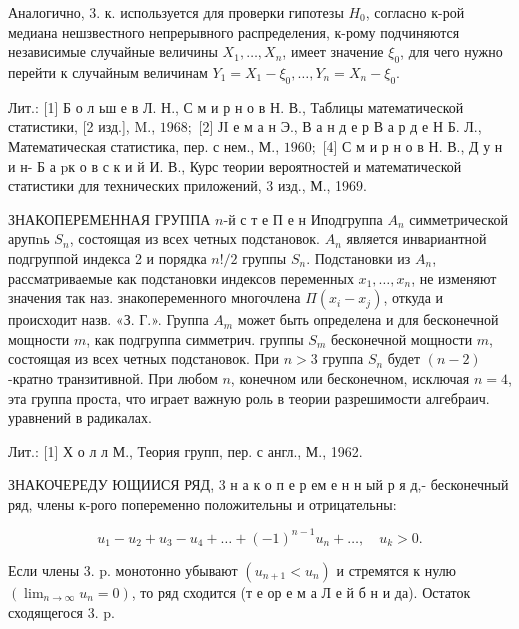\documentclass[10pt]{article}
\begin{document}
Аналогично, 3. к. используется для проверки гипотезы $H_{0}$, согласно к-рой медиана нешзвестного непрерывного распределения, к-рому подчиняются независимые случайные величины $X_{1}, \ldots, X_{n}$, имеет значение $\xi_{0}$, для чего нужно перейти к случайным величинам $Y_{1}=X_{1}-\xi_{0}, \ldots, Y_{n}=X_{n}-\xi_{0}$.



Лит.: [1] Б о л ьш е в Л. Н., С м и р н о в Н. В., Таблицы математической статистики, [2 изд.], M., $1968 ;$ [2] ЈI е м а н Э., В а н д е р В а р д е Н Б. Л., Математическая статистика, пер. с нем., М., $1960 ;$ [4] С м и р н о в Н. В., Д у н и н- Б а pк о в с к и й И. В., Курс теории вероятностей и математической статистики для технических приложений, 3 изд., М., 1969.



ЗНАКОПЕРЕМЕННАЯ ГРУППА $n$-й с т е П е н Иподгруппа $A_{n}$ симметрической арупnь $S_{n}$, состоящая из всех четных подстановок. $A_{n}$ является инвариантной подгруппой индекса 2 и порядка $n ! / 2$ группы $S_{n}$. Подстановки из $A_{n}$, рассматриваемые как подстановки индексов переменных $x_{1}, \ldots, x_{n}$, не изменяют значения так наз. знакопеременного многочлена $\Pi\left(x_{i}-x_{j}\right)$, откуда и происходит назв. «З. Г.». Группа $A_{m}$ может быть определена и для бесконечной мощности $m$, как подгруппа симметрич. группы $S_{m}$ бесконечной мощности $m$, состоящая из всех четных подстановок. При $n>3$ группа $S_{n}$ будет $(n-2)$-кратно транзитивной. При любом $n$, конечном или бесконечном, исключая $n=4$, эта группа проста, что играет важную роль в теории разрешимости алгебраич. уравнений в радикалах.



Лит.: [1] Х о л л М., Теория групп, пер. с англ., М., 1962.



ЗНАКОЧЕРЕДУ ЮЩИИСЯ РЯД, 3 н а к о п е р ем е н н ый р я д,- бесконечный ряд, члены к-рого попеременно положительны и отрицательны:



\[

u_{1}-u_{2}+u_{3}-u_{4}+\ldots+(-1)^{n-1} u_{n}+\ldots, \quad u_{k}>0 .

\]



Если члены 3. p. монотонно убывают $\left(u_{n+1}<u_{n}\right)$ и стремятся к нулю $\left(\lim _{n \rightarrow \infty} u_{n}=0\right)$, то ряд сходится (т е ор е м а Л е й б н и да). Остаток сходящегося 3. p.
\end{document}
